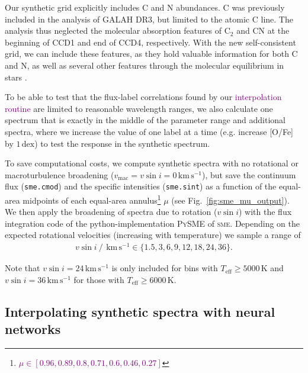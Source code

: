 \documentclass[
  journal=pasa,
  manuscript=research-paper, %
  year=2024,
  volume=37
]{cup-journal}
\newcommand{\adjusted}[1]{{\textcolor{purple}{#1}}}
\newcommand{\Teff}{$T_\mathrm{eff}$\xspace}
\newcommand{\vsini}{$v \sin i$\xspace}
\newcommand{\sme}{\textsc{sme}\xspace}
\newcommand{\dex}{\,\mathrm{dex}}	%
\newcommand{\kms}{\,\mathrm{km\,s^{-1}}}	%
\begin{document}
Our synthetic grid explicitly includes C and N abundances. C was previously included in the analysis of GALAH DR3, but limited to the atomic C line. The analysis thus neglected the molecular absorption features of $\mathrm{C_2}$ and CN at the beginning of CCD1 and end of CCD4, respectively. With the new self-consistent grid, we can include these features, as they hold valuable information for both C and N, as well as several other features through the molecular equilibrium in stars \citep[see e.g.][]{Ting2018}.

To be able to test that the flux-label correlations found by our \adjusted{interpolation routine} are limited to reasonable wavelength ranges, we also calculate one spectrum that is exactly in the middle of the parameter range and additional spectra, where we increase the value of one label at a time (e.g. increase [O/Fe] by $1\dex$) to test the response in the synthetic spectrum.

To save computational costs, we compute synthetic spectra with no rotational or macroturbulence broadening ($v_\text{mac} = v\sin i = 0\kms$), but save the continuum flux (\texttt{sme.cmod}) and the specific intensities (\texttt{sme.sint}) as a function of the equal-area midpoints of each equal-area annulus\footnote{\adjusted{$\mu \in [0.96, 0.89, 0.8, 0.71, 0.6, 0.46, 0.27]$}} $\mu$ (see Fig.~\ref{fig:sme_mu_output}). We then apply the broadening of spectra due to rotation (\vsini) with the flux integration code of the python-implementation \textsc{PySME} \citep{Wehrhahn2023} of \sme. Depending on the expected rotational velocities (increasing with temperature) we sample a range of
\begin{align} \label{eq:vsini}
    v \sin i~/~\kms \in \{ 1.5, 3, 6, 9, 12, 18, 24, 36\}.
\end{align}

Note that $v \sin i = 24 \kms$ is only included for bins with \Teff$\geq 5000\,\mathrm{K}$ and $v \sin i = 36 \kms$ for those with \Teff$\geq 6000\,\mathrm{K}$.


\subsection{Interpolating synthetic spectra with neural networks} \label{sec:interpolating_synthetic_spectra_with_neural_networks}
\end{document}
